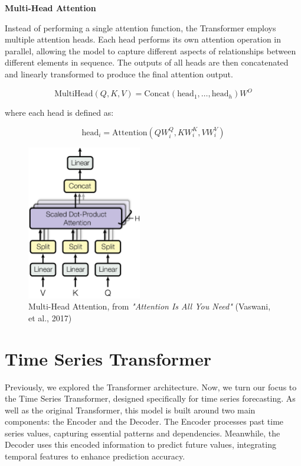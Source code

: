 \noindent\textbf{Multi-Head Attention}

\noindent Instead of performing a single attention function, the Transformer employs multiple attention heads. Each head performs its own attention operation in parallel, allowing the model to capture different aspects of relationships between different elements in sequence. The outputs of all heads are then concatenated and linearly transformed to produce the final attention output.

\begin{equation}
\text{MultiHead}(Q,K,V) = \text{Concat}(\text{head}_1, \ldots, \text{head}_h) W^O
\end{equation}

\noindent where each head is defined as:

\begin{equation}
\text{head}_i = \text{Attention}(QW_i^Q, KW_i^K, VW_i^V)
\end{equation}

\begin{figure}[htbp]
    \centering
    \includegraphics[width=5cm]{3_ChapterTranformerVariants/figuras/MultiHeadAttention.png}
    \caption{Multi-Head Attention, from \textit{"Attention Is All You Need"} (Vaswani, et al., 2017) \cite{vaswani2023attention}}
    \end{figure}

\section{Time Series Transformer}

Previously, we explored the Transformer architecture. Now, we turn our focus to the Time Series Transformer, designed specifically for time series forecasting. As well as the original Transformer, this model is built around two main components: the Encoder and the Decoder. The Encoder processes past time series values, capturing essential patterns and dependencies. Meanwhile, the Decoder uses this encoded information to predict future values, integrating temporal features to enhance prediction accuracy.

